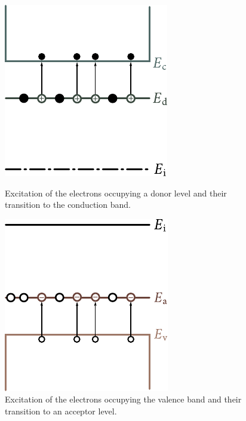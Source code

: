 \begin{figure}[!h]
	\begin{minipage}[h]{0.48\linewidth}
		\begin{center}
			\includegraphics[scale=1]{figures/ch_05/fig_5_20.pdf}
			\caption[]{Excitation of the electrons occupying a donor level and their transition to the conduction band.}
			\label{fig:5_20}
		\end{center}
	\end{minipage}
	\hfill{ }%
	\begin{minipage}[h]{0.48\linewidth}
		\begin{center}
			\includegraphics[scale=1]{figures/ch_05/fig_5_21.pdf}
			\caption[]{Excitation of the electrons occupying the valence band and their transition to an acceptor level.}
			\label{fig:5_21}
		\end{center}
	\end{minipage}
\vspace{-0.3cm}
\end{figure}

